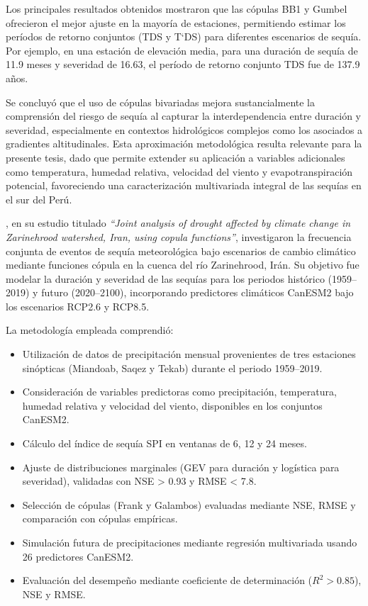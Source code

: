 Los principales resultados obtenidos mostraron que las cópulas BB1 y Gumbel ofrecieron el mejor ajuste en la mayoría de estaciones, permitiendo estimar los períodos de retorno conjuntos (TDS y T`DS) para diferentes escenarios de sequía. Por ejemplo, en una estación de elevación media, para una duración de sequía de 11.9 meses y severidad de 16.63, el período de retorno conjunto TDS fue de 137.9 años.

Se concluyó que el uso de cópulas bivariadas mejora sustancialmente la comprensión del riesgo de sequía al capturar la interdependencia entre duración y severidad, especialmente en contextos hidrológicos complejos como los asociados a gradientes altitudinales. Esta aproximación metodológica resulta relevante para la presente tesis, dado que permite extender su aplicación a variables adicionales como temperatura, humedad relativa, velocidad del viento y evapotranspiración potencial, favoreciendo una caracterización multivariada integral de las sequías en el sur del Perú.


\textcite{Samadian2024}, en su estudio titulado \textit{“Joint analysis of drought affected by climate change in Zarinehrood watershed, Iran, using copula functions”}, investigaron la frecuencia conjunta de eventos de sequía meteorológica bajo escenarios de cambio climático mediante funciones cópula en la cuenca del río Zarinehrood, Irán. Su objetivo fue modelar la duración y severidad de las sequías para los periodos histórico (1959–2019) y futuro (2020–2100), incorporando predictores climáticos CanESM2 bajo los escenarios RCP2.6 y RCP8.5.

La metodología empleada comprendió:
\begin{itemize}
    \item Utilización de datos de precipitación mensual provenientes de tres estaciones sinópticas (Miandoab, Saqez y Tekab) durante el periodo 1959–2019.
    \item Consideración de variables predictoras como precipitación, temperatura, humedad relativa y velocidad del viento, disponibles en los conjuntos CanESM2.
    \item Cálculo del índice de sequía SPI en ventanas de 6, 12 y 24 meses.
    \item Ajuste de distribuciones marginales (GEV para duración y logística para severidad), validadas con NSE > 0.93 y RMSE < 7.8.
    \item Selección de cópulas (Frank y Galambos) evaluadas mediante NSE, RMSE y comparación con cópulas empíricas.
    \item Simulación futura de precipitaciones mediante regresión multivariada usando 26 predictores CanESM2.
    \item Evaluación del desempeño mediante coeficiente de determinación ($R^2 > 0.85$), NSE y RMSE.
\end{itemize}

